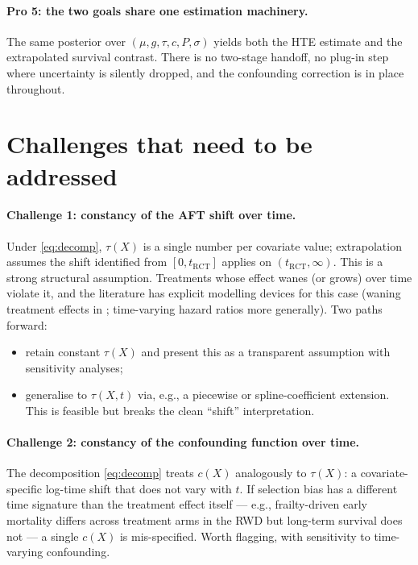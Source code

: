 \documentclass[11pt]{article}
\newcommand{\X}{X}
\newcommand{\tauf}{\tau}
\newcommand{\cf}{c}
\newcommand{\gf}{g}
\newcommand{\muf}{\mu}
\newcommand{\RCT}{\mathrm{RCT}}
\begin{document}
\paragraph{Pro 5: the two goals share one estimation machinery.} The same
posterior over $(\muf, \gf, \tauf, \cf, P, \sigma)$ yields both
the HTE estimate and the extrapolated survival contrast. There is no
two-stage handoff, no plug-in step where uncertainty is silently dropped,
and the confounding correction is in place throughout.

\section{Challenges that need to be addressed}

\paragraph{Challenge 1: constancy of the AFT shift over time.}
Under \eqref{eq:decomp}, $\tauf(\X)$ is a single number per covariate value;
extrapolation assumes the shift identified from $[0, t_{\RCT}]$ applies on
$(t_{\RCT}, \infty)$. This is a strong structural assumption. Treatments
whose effect wanes (or grows) over time violate it, and the literature has
explicit modelling devices for this case (waning treatment effects in
\citet{Jackson2023}; time-varying hazard ratios more generally). Two paths
forward:
\begin{itemize}[leftmargin=*]
  \item[(a)] retain constant $\tauf(\X)$ and present this as a transparent
        assumption with sensitivity analyses;
  \item[(b)] generalise to $\tauf(\X, t)$ via, e.g., a piecewise or
        spline-coefficient extension. This is feasible but breaks the
        clean ``shift'' interpretation.
\end{itemize}

\paragraph{Challenge 2: constancy of the confounding function over time.}
The decomposition \eqref{eq:decomp} treats $\cf(\X)$ analogously to
$\tauf(\X)$: a covariate-specific log-time shift that does not vary with $t$.
If selection bias has a different time signature than the treatment effect
itself --- e.g., frailty-driven early mortality differs across treatment
arms in the RWD but long-term survival does not --- a single $\cf(\X)$ is
mis-specified. Worth flagging, with sensitivity to time-varying confounding.
\end{document}

